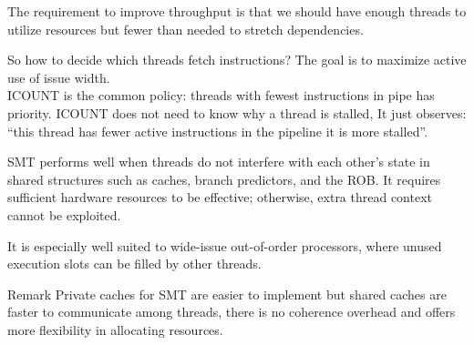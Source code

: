     The requirement to improve throughput is that we should have enough threads to utilize resources but fewer than needed to stretch dependencies.
    \begin{tcolorbox}[gris]
        So how to decide which threads fetch instructions? The goal is to maximize active use of issue width. \\
        
            ICOUNT is the common policy: threads with fewest instructions in pipe has priority. ICOUNT does not need to know why a thread is stalled, It just observes: ``this thread has fewer active instructions in the pipeline \textrightarrow \space it is more stalled''.
    \end{tcolorbox}
    SMT performs well when threads do not interfere with each other’s state in shared structures such as caches, branch predictors, and the ROB. It requires sufficient hardware resources to be effective; otherwise, extra thread context cannot be exploited.

    It is especially well suited to wide-issue out-of-order processors, where unused execution slots can be filled by other threads.

    \begin{remark}{Remark}
        Private caches for SMT are easier to implement but shared caches are faster to communicate among threads, there is no coherence overhead and offers more flexibility in allocating resources.
    \end{remark}
